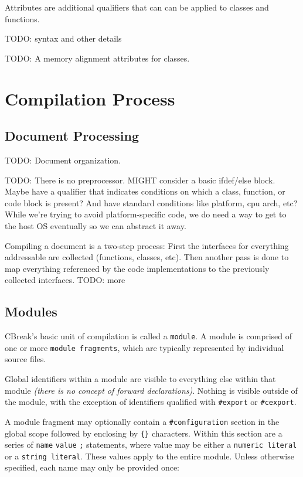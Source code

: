 \documentclass{article}
\newcommand{\code}[1]{\colorbox{light-gray}{\texttt{#1}}}
\begin{document}
Attributes are additional qualifiers that can can be applied to classes and functions.

TODO: syntax and other details

TODO: A memory alignment attributes for classes.

\newpage

\section{Compilation Process}

\subsection{Document Processing}

TODO: Document organization.

TODO: There is no preprocessor.  MIGHT consider a basic ifdef/else block.  Maybe have a qualifier that indicates conditions on which a class, function, or code block is present?  And have standard conditions like platform, cpu arch, etc?  While we're trying to avoid platform-specific code, we do need a way to get to the host OS eventually so we can abstract it away.

Compiling a document is a two-step process: First the interfaces for everything addressable are collected (functions, classes, etc).  Then another pass is done to map everything referenced by the code implementations to the previously collected interfaces.  TODO: more

\subsection{Modules}

CBreak's basic unit of compilation is called a \code{module}.  A module is comprised of one or more \code{module fragments}, which are typically represented by individual source files.

Global identifiers within a module are visible to everything else within that module \textit{(there is no concept of forward declarations)}.  Nothing is visible outside of the module, with the exception of identifiers qualified with \code{\#export} or \code{\#cexport}.

A module fragment may optionally contain a \code{\#configuration} section in the global scope followed by enclosing by \code{\{\}} characters.  Within this section are a series of \code{name} \code{value} \code{;} statements, where value may be either a \code{numeric literal} or a \code{string literal}.  These values apply to the entire module.  Unless otherwise specified, each name may only be provided once:
\end{document}
